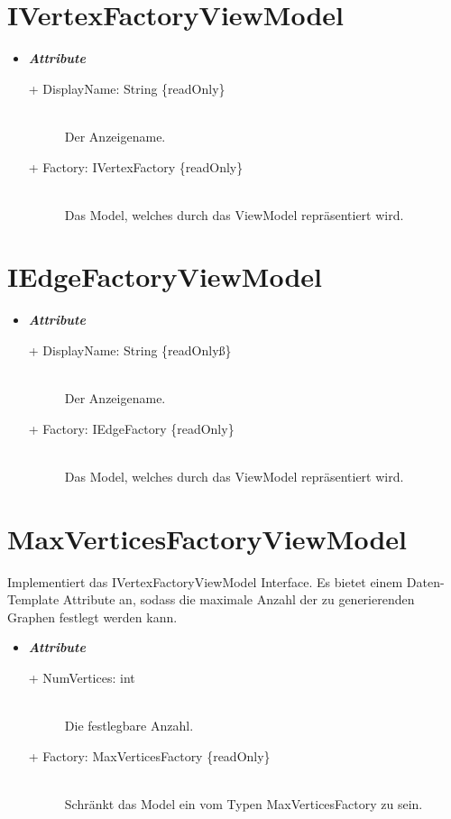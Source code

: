 \documentclass[13pt]{scrreprt}
\begin{document}
	\section{IVertexFactoryViewModel}
	\begin{itemize}[label = {$\circ$}]
		\item {\large \textbf{\textit{Attribute}}\par}
		\begin{description}
			\item [+ DisplayName: String \{readOnly\}] \hfill \\ Der Anzeigename.
			\item [+ Factory: IVertexFactory \{readOnly\}] \hfill \\ Das Model, welches durch das ViewModel repr\"asentiert wird.	
		\end{description}
	\end{itemize}
	
	\section{IEdgeFactoryViewModel}
	\begin{itemize}[label = {$\circ$}]
		\item {\large \textbf{\textit{Attribute}}\par}
		\begin{description}
			\item [+ DisplayName: String \{readOnlyß\}] \hfill \\ Der Anzeigename.
			\item [+ Factory: IEdgeFactory \{readOnly\}] \hfill \\ Das Model, welches durch das ViewModel repr\"asentiert wird.	
		\end{description}
	\end{itemize}

	\section{MaxVerticesFactoryViewModel}
	Implementiert das IVertexFactoryViewModel Interface. Es bietet einem Daten-Template Attribute an, sodass die maximale Anzahl der zu generierenden Graphen festlegt werden kann.
	\begin{itemize}[label = {$\circ$}]
		\item {\large \textbf{\textit{Attribute}}\par}
		\begin{description}
			\item [+ NumVertices: int] \hfill \\ Die festlegbare Anzahl.
			\item [+ Factory: MaxVerticesFactory \{readOnly\}] \hfill \\ Schr\"ankt das Model ein vom Typen MaxVerticesFactory zu sein.			
		\end{description}
	\end{itemize}
	\newpage
\end{document}
